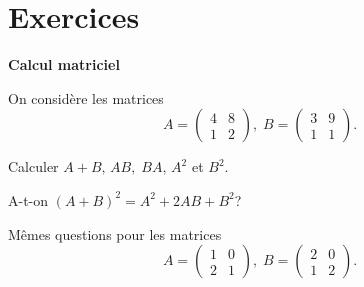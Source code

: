 \documentclass[12pt,a4paper]{book}
\newcommand{\sect}[1]{\begin{tcolorbox}[colframe=white,top=2pt,bottom=2pt,colback=red!14]
		\centering \textbf{#1}
	\end{tcolorbox}
}
\begin{document}
\newpage

\section{Exercices}

\begin{multicols*}{2} 
	\sect{Calcul matriciel}
	\begin{Exercice}
		On considère les matrices
		\[ 
		A=\begin{pmatrix}
		4 & 8 \\
		1 & 2  
		\end{pmatrix},\;
		B=\begin{pmatrix}
		3 & 9 \\
		1 & 1  
		\end{pmatrix}.
		\]
		
		\begin{listexos}
			\item Calculer $A+B,\,AB,\;BA,\,A^2$ et $B^2$.
			\item A-t-on $(A+B)^2=A^2+2AB+B^2$?	
			\item Mêmes questions pour les matrices 
			\[ 
			A=\begin{pmatrix}
			1 & 0 \\
			2 & 1 
			\end{pmatrix},\;B=\begin{pmatrix}
			2 & 0 \\
			1 & 2  
			\end{pmatrix}.
			\]
		\end{listexos}
	\end{Exercice}
	

\end{multicols*}
\end{document}
